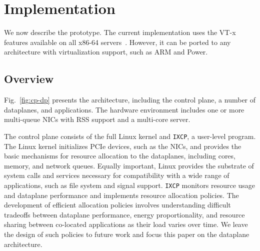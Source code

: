 
\section{\ix Implementation}
\label{sec:impl}



We now describe the \ix prototype.  The current implementation uses
the VT-x features available on all x86-64
servers~\cite{DBLP:journals/computer/UhligNRSMABKLS05}. However, it can
be ported to any architecture with virtualization support, such as ARM
and Power.




\subsection{Overview}
\label{sec:impl:overview}

Fig.~\ref{fig:cp-dp} presents the \ix architecture, including the
control plane, a number of dataplanes, and applications. The hardware
environment includes one or more multi-queue NICs with RSS support and
a multi-core server.

The \ix control plane consists of the full Linux kernel and
\texttt{IXCP}, a user-level program. The Linux kernel initializes PCIe
devices, such as the NICs, and provides the basic mechanisms for
resource allocation to the dataplanes, including cores, memory, and
network queues. Equally important, Linux provides the substrate of
system calls and services necessary for compatibility with a wide
range of applications, such as file system and signal
support. \texttt{IXCP} monitors resource usage and dataplane
performance and implements resource allocation policies. The
development of efficient allocation policies involves understanding
difficult tradeoffs between dataplane performance, energy
proportionality, and resource sharing between co-located applications
as their load varies over time.  We leave the design of such policies
to future work and focus this paper on the \ix dataplane architecture.

